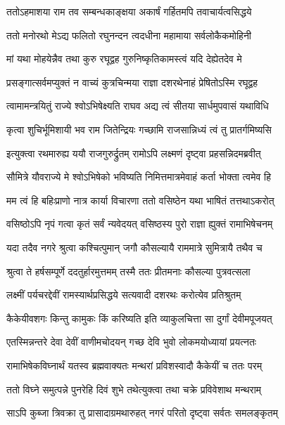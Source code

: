 \twolineshloka
{ततोऽहमाशया राम तव सम्बन्धकाङ्क्षया}
{अकार्षं गर्हितमपि तवाचार्यत्वसिद्धये} %

\twolineshloka
{ततो मनोरथो मेऽद्य फलितो रघुनन्दन}
{त्वदधीना महामाया सर्वलोकैकमोहिनी} %

\twolineshloka
{मां यथा मोहयेन्नैव तथा कुरु रघूद्वह}
{गुरुनिष्कृतिकामस्त्वं यदि देह्येतदेव मे} %

\twolineshloka
{प्रसङ्गात्सर्वमप्युक्तं न वाच्यं कुत्रचिन्मया}
{राज्ञा दशरथेनाहं प्रेषितोऽस्मि रघूद्वह} %

\twolineshloka
{त्वामामन्त्रयितुं राज्ये श्वोऽभिषेक्ष्यति राघव}
{अद्य त्वं सीतया सार्धमुपवासं यथाविधि} %

\twolineshloka
{कृत्वा शुचिर्भूमिशायी भव राम जितेन्द्रियः}
{गच्छामि राजसान्निध्यं त्वं तु प्रातर्गमिष्यसि} %

\twolineshloka
{इत्युक्त्वा रथमारुह्य ययौ राजगुरुर्द्रुतम्}
{रामोऽपि लक्ष्मणं दृष्ट्वा प्रहसन्निदमब्रवीत्} %

\twolineshloka
{सौमित्रे यौवराज्ये मे श्वोऽभिषेको भविष्यति}
{निमित्तमात्रमेवाहं कर्ता भोक्ता त्वमेव हि} %

\twolineshloka
{मम त्वं हि बहिःप्राणो नात्र कार्या विचारणा}
{ततो वसिष्ठेन यथा भाषितं तत्तथाऽकरोत्} %

\twolineshloka
{वसिष्ठोऽपि नृपं गत्वा कृतं सर्वं न्यवेदयत्}
{वसिष्ठस्य पुरो राज्ञा ह्युक्तं रामाभिषेचनम्} %

\twolineshloka
{यदा तदैव नगरे श्रुत्वा कश्चित्पुमान् जगौ}
{कौसल्यायै राममात्रे सुमित्रायै तथैव च} %

\twolineshloka
{श्रुत्वा ते हर्षसम्पूर्णे ददतुर्हारमुत्तमम्}
{तस्मै ततः प्रीतमनाः कौसल्या पुत्रवत्सला} %

\twolineshloka
{लक्ष्मीं पर्यचरद्देवीं रामस्यार्थप्रसिद्धये}
{सत्यवादी दशरथः करोत्येव प्रतिश्रुतम्} %

\twolineshloka
{कैकेयीवशगः किन्तु कामुकः किं करिष्यति}
{इति व्याकुलचित्ता सा दुर्गां देवीमपूजयत्} %

\twolineshloka
{एतस्मिन्नन्तरे देवा देवीं वाणीमचोदयन्}
{गच्छ देवि भुवो लोकमयोध्यायां प्रयत्नतः} %

\twolineshloka
{रामाभिषेकविघ्नार्थं यतस्व ब्रह्मवाक्यतः}
{मन्थरां प्रविशस्वादौ कैकेयीं च ततः परम्} %

\twolineshloka
{ततो विघ्ने समुत्पन्ने पुनरेहि दिवं शुभे}
{तथेत्युक्त्वा तथा चक्रे प्रविवेशाथ मन्थराम्} %

\twolineshloka
{साऽपि कुब्जा त्रिवक्रा तु प्रासादाग्रमथारुहत्}
{नगरं परितो दृष्ट्वा सर्वतः समलङ्कृतम्} %

